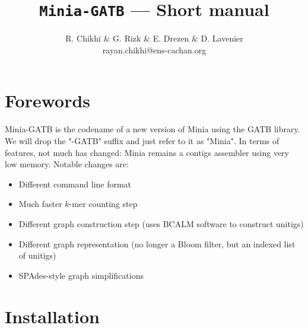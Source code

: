 \documentclass[a4paper]{article}
\begin{document}
\newcommand\vitem[1][]{\SaveVerb[%
    aftersave={\item[\textnormal{\UseVerb[#1]{vsave}}]}]{vsave}}

\title{\Huge \texttt{Minia-GATB} --- Short manual}

\author{R. Chikhi \& G. Rizk \& E. Drezen \& D. Lavenier\\
        {\small{rayan.chikhi@ens-cachan.org}}}
\maketitle

\begin{abstract}
\end{abstract}

\tableofcontents

\section{Forewords}

Minia-GATB is the codename of a new version of Minia using the GATB library. We will drop the "-GATB" suffix and just refer to it as "Minia". 
In terms of features, not much has changed: Minia remains a contigs assembler using very low memory. Notable changes are:
\begin{itemize}
    \item Different command line format 
    \item Much faster $k$-mer counting step
    \item Different graph construction step (uses BCALM software to construct unitigs)
    \item Different graph representation (no longer a Bloom filter, but an indexed list of unitigs)
    \item SPAdes-style graph simplifications
\end{itemize}

\section{Installation}
\end{document}
